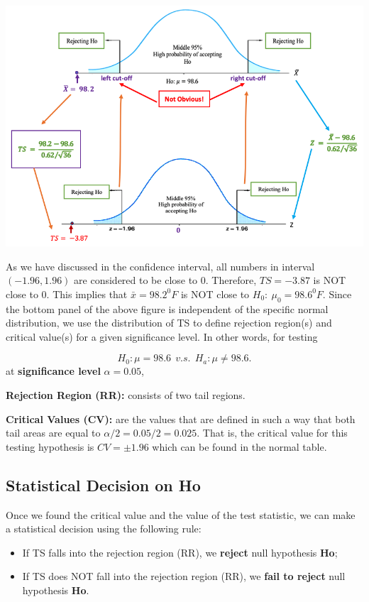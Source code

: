 \documentclass[
]{book}
\begin{document}
\begin{center}\includegraphics[width=0.7\linewidth]{week08/example06CV-RR} \end{center}

As we have discussed in the confidence interval, all numbers in interval \((-1.96, 1.96)\) are considered to be close to \(0\). Therefore, \(TS = -3.87\) is NOT close to 0. This implies that \(\bar{x} = 98.2^0F\) is NOT close to \(H_0: \ \mu_0 = 98.6^0F\). Since the bottom panel of the above figure is independent of the specific normal distribution, we use the distribution of TS to define rejection region(s) and critical value(s) for a given significance level. In other words, for testing

\[ H_0: \mu = 98.6  \ \ v.s. \ \ H_a: \mu \ne 98.6.\]
at \textbf{significance level} \(\alpha = 0.05\),

\textbf{Rejection Region (RR): } consists of two tail regions.

\textbf{Critical Values (CV): } are the values that are defined in such a way that both tail areas are equal to \(\alpha/2 = 0.05/2 = 0.025.\) That is, the critical value for this testing hypothesis is \(CV = \pm 1.96\) which can be found in the normal table.

\hfill\break

\hypertarget{statistical-decision-on-ho}{%
\subsection{\texorpdfstring{Statistical Decision on \textbf{Ho}}{Statistical Decision on Ho}}\label{statistical-decision-on-ho}}

Once we found the critical value and the value of the test statistic, we can make a statistical decision using the following rule:

\begin{itemize}
\item
  If TS falls into the rejection region (RR), we \textbf{reject} null hypothesis \textbf{Ho};
\item
  If TS does NOT fall into the rejection region (RR), we \textbf{fail to reject} null hypothesis \textbf{Ho}.
\end{itemize}
\end{document}
